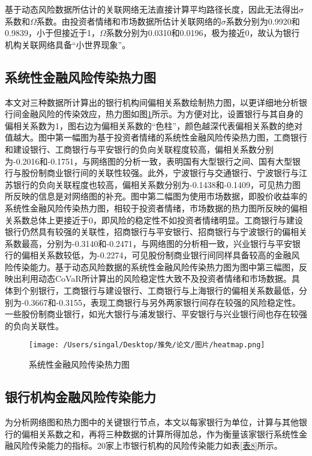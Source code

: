\documentclass[lang=cn]{elegantpaper}
\begin{document}
基于动态风险数据所估计的关联网络无法直接计算平均路径长度，因此无法得出$\sigma$系数和$\Omega$系数。由投资者情绪和市场数据所估计关联网络的$\sigma$系数分别为0.9920和0.9839，小于但接近于1，$\Omega$系数分别为0.0310和0.0196，极为接近0，故认为银行机构关联网络具备“小世界现象”。

\subsection{系统性金融风险传染热力图}
本文对三种数据所计算出的银行机构间偏相关系数绘制热力图，以更详细地分析银行间金融风险的传染效应，热力图如图\ref{图7}所示。为方便对比，设置银行与其自身的偏相关系数为1，图右边为偏相关系数的“色柱”，颜色越深代表偏相关系数的绝对值越大。图中第一幅图为基于投资者情绪的系统性金融风险传染热力图，工商银行和建设银行、工商银行与平安银行的负向关联程度较高，偏相关系数分别为-0.2016和-0.1751，与网络图的分析一致，表明国有大型银行之间、国有大型银行与股份制商业银行间的关联性较强。此外，宁波银行与交通银行、宁波银行与江苏银行的负向关联程度也较高，偏相关系数分别为-0.1438和-0.1409，可见热力图所反映的信息是对网络图的补充。图中第二幅图为使用市场数据，即股价收益率的系统性金融风险传染热力图，相较于投资者情绪，市场数据的热力图所反映的偏相关系数总体上更接近于0，即风险的稳定性不如投资者情绪明显。工商银行与建设银行仍然具有较强的关联性，招商银行与平安银行、招商银行与宁波银行的偏相关系数最高，分别为-0.3140和-0.2471，与网络图的分析相一致，兴业银行与平安银行的偏相关系数较低，为-0.2274，可见股份制商业银行间同样具备较高的金融风险传染能力。基于动态风险数据的系统性金融风险传染热力图为图中第三幅图，反映出利用动态CoVaR所计算出的风险稳定性大致不及投资者情绪和市场数据。具体到个别银行，工商银行与建设银行、工商银行与上海银行的偏相关系数最低，分别为-0.3667和-0.3155，表现工商银行与另外两家银行间存在较强的风险稳定性。一些股份制商业银行，如光大银行与浦发银行、平安银行与兴业银行间也存在较强的负向关联性。

\begin{figure}[htb]
    \centering
    \texttt{[image: /Users/singal/Desktop/推免/论文/图片/heatmap.png]}
    \caption{系统性金融风险传染热力图}
    \label{图7}
\end{figure}
\subsection{银行机构金融风险传染能力}
为分析网络图和热力图中的关键银行节点，本文以每家银行为单位，计算与其他银行的偏相关系数之和，再将三种数据的计算所得加总，作为衡量该家银行系统性金融风险传染能力的指标。20家上市银行机构的风险传染能力如表\ref{表8}所示。
\end{document}
